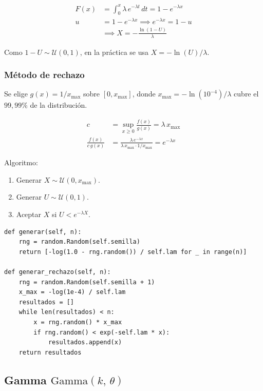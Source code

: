 \documentclass[a4paper, 11pt]{article}
\begin{document}
\begin{align}
  F(x) &= \int_0^x \lambda\,e^{-\lambda t}\,dt = 1 - e^{-\lambda x} \\[4pt]
  u    &= 1 - e^{-\lambda x} \implies e^{-\lambda x} = 1 - u \\[4pt]
       &\implies \boxed{X = -\frac{\ln(1-U)}{\lambda}}
  \label{eq:exp_inv}
\end{align}

Como $1 - U \sim \mathcal{U}(0,1)$, en la práctica se usa $X = -\ln(U)/\lambda$.

\subsubsection*{Método de rechazo}

Se elige $g(x) = 1/x_{\max}$ sobre $[0, x_{\max}]$, donde $x_{\max} = -\ln(10^{-4})/\lambda$
cubre el $99{,}99\%$ de la distribución.

\begin{align}
  c &= \sup_{x \geq 0} \frac{f(x)}{g(x)} = \lambda\,x_{\max} \\[4pt]
  \frac{f(x)}{c\,g(x)} &= \frac{\lambda\,e^{-\lambda x}}{\lambda\,x_{\max} \cdot 1/x_{\max}} = e^{-\lambda x}
\end{align}

Algoritmo:
\begin{enumerate}
  \item Generar $X \sim \mathcal{U}(0, x_{\max})$.
  \item Generar $U \sim \mathcal{U}(0,1)$.
  \item Aceptar $X$ si $U < e^{-\lambda X}$.
\end{enumerate}

\begin{lstlisting}[style=python, caption={Generador exponencial — transformada inversa y rechazo.}]
def generar(self, n):
    rng = random.Random(self.semilla)
    return [-log(1.0 - rng.random()) / self.lam for _ in range(n)]

def generar_rechazo(self, n):
    rng = random.Random(self.semilla + 1)
    x_max = -log(1e-4) / self.lam
    resultados = []
    while len(resultados) < n:
        x = rng.random() * x_max
        if rng.random() < exp(-self.lam * x):
            resultados.append(x)
    return resultados
\end{lstlisting}


\subsection{Gamma \texorpdfstring{$\mathrm{Gamma}(k,\,\theta)$}{Gamma(k,theta)}}
\end{document}
